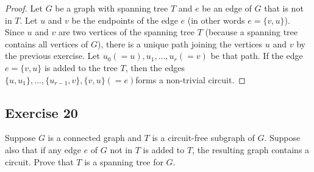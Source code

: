 \documentclass[14pt]{extarticle}
\begin{document}
\begin{proof}
    Let \(G\) be a graph with spanning tree \(T\) and \(e\) be an edge of \(G\) that is not in \(T\). Let \(u\) and \(v\) be the
    endpoints of the edge \(e\) (in other words \(e = \{v,u\}\)). Since \(u\) and \(v\) are two vertices of the spanning tree
    \(T\) (because a spanning tree contains all vertices of \(G\)), there is a unique path joining the vertices \(u\) and
    \(v\) by the previous exercise. Let \(u_0 (= u), u_1, \ldots, u_r (= v)\) be that path. If the edge \(e = \{v, u\}\) is
    added to the tree \(T\), then the edges \(\{u, u_1\}, \ldots, \{u_{r-1}, v\}, \{v, u\} (= e)\)forms a non-trivial circuit.
\end{proof}

\subsection{Exercise 20}
Suppose \(G\) is a connected graph and \(T\) is a circuit-free subgraph of \(G\). Suppose also that if any edge \(e\) of
\(G\) not in \(T\) is added to \(T\), the resulting graph contains a circuit. Prove that \(T\) is a spanning tree
for \(G\).
\end{document}

